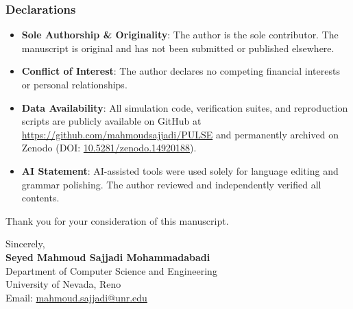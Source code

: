 \documentclass[11pt,a4paper]{article}
\begin{document}
\subsubsection*{Declarations}
\begin{itemize}
    \item \textbf{Sole Authorship \& Originality}: The author is the sole contributor. The manuscript is original and has not been submitted or published elsewhere.
    \item \textbf{Conflict of Interest}: The author declares no competing financial interests or personal relationships.
    \item \textbf{Data Availability}: All simulation code, verification suites, and reproduction scripts are publicly available on GitHub at \url{https://github.com/mahmoudsajjadi/PULSE} and permanently archived on Zenodo (DOI: \href{https://doi.org/10.5281/zenodo.14920188}{10.5281/zenodo.14920188}).
    \item \textbf{AI Statement}: AI-assisted tools were used solely for language editing and grammar polishing. The author reviewed and independently verified all contents.
\end{itemize}

Thank you for your consideration of this manuscript.

\vspace{1em}
Sincerely,\\[1em]
\textbf{Seyed Mahmoud Sajjadi Mohammadabadi}\\
Department of Computer Science and Engineering\\
University of Nevada, Reno\\
Email: \href{mailto:mahmoud.sajjadi@unr.edu}{mahmoud.sajjadi@unr.edu}
\end{document}
